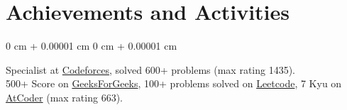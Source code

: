\documentclass[10pt, letterpaper]{article}
\newenvironment{onecolentry}{
    \begin{adjustwidth}{
        0 cm + 0.00001 cm
    }{
        0 cm + 0.00001 cm
    }
}{
    \end{adjustwidth}
} %
\begin{document}
    
    \section{Achievements and Activities}
            
        \begin{onecolentry}
                Specialist at \href{https://codeforces.com/profile/lakshaysethi} {Codeforces}, solved 600+ problems (max rating 1435). 
                \\
                500+ Score on \href{https://www.geeksforgeeks.org/user/lakshaysethi039/}{GeeksForGeeks},
                100+ problems solved on \href{https://leetcode.com/u/lakshaysethi039/}{Leetcode},
                7 Kyu on \href{https://atcoder.jp/users/lakshaysethi}{AtCoder} (max rating 663).
        \end{onecolentry}


    
   



    
    


    
\end{document}
